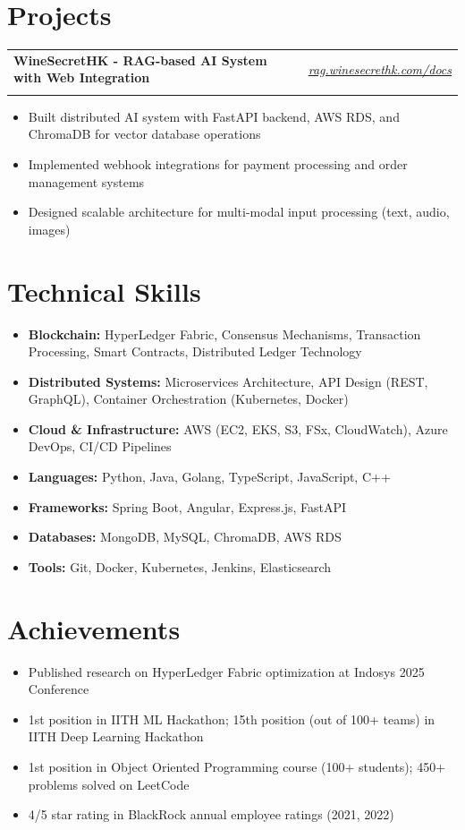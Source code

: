 \documentclass[11pt,a4paper]{article}
\makeatletter
\newcommand{\resumeItem}[1]{\item\small{#1}}
\newlength{\resumeLeftCol}
\newlength{\resumeRightCol}
\newcommand{\resumeHeading}[4]{
  \begin{tabular*}{\textwidth}{@{}p{\resumeLeftCol}@{\extracolsep{\fill}}>{\raggedleft\arraybackslash}p{\resumeRightCol}@{}}
    \textbf{#1} & \textit{#2} \\
    & \textit{\ifstrempty{#4}{#3}{#3 \ #4}}
  \end{tabular*}
  \vspace{-4pt}
}
\makeatother
\begin{document}
\section{Projects}
\resumeHeading{WineSecretHK - RAG-based AI System with Web Integration}{\href{https://rag.winesecrethk.com/docs}{rag.winesecrethk.com/docs}}{}{}
\begin{itemize}[leftmargin=*,noitemsep,topsep=0pt]
    \resumeItem{Built distributed AI system with FastAPI backend, AWS RDS, and ChromaDB for vector database operations}
    \resumeItem{Implemented webhook integrations for payment processing and order management systems}
    \resumeItem{Designed scalable architecture for multi-modal input processing (text, audio, images)}
\end{itemize}

\section{Technical Skills}
\begin{itemize}[leftmargin=*,noitemsep,topsep=0pt]
    \resumeItem{\textbf{Blockchain:} HyperLedger Fabric, Consensus Mechanisms, Transaction Processing, Smart Contracts, Distributed Ledger Technology}
    \resumeItem{\textbf{Distributed Systems:} Microservices Architecture, API Design (REST, GraphQL), Container Orchestration (Kubernetes, Docker)}
    \resumeItem{\textbf{Cloud \& Infrastructure:} AWS (EC2, EKS, S3, FSx, CloudWatch), Azure DevOps, CI/CD Pipelines}
    \resumeItem{\textbf{Languages:} Python, Java, Golang, TypeScript, JavaScript, C++}
    \resumeItem{\textbf{Frameworks:} Spring Boot, Angular, Express.js, FastAPI}
    \resumeItem{\textbf{Databases:} MongoDB, MySQL, ChromaDB, AWS RDS}
    \resumeItem{\textbf{Tools:} Git, Docker, Kubernetes, Jenkins, Elasticsearch}
\end{itemize}

\section{Achievements}
\begin{itemize}[leftmargin=*,noitemsep,topsep=0pt]
    \resumeItem{Published research on HyperLedger Fabric optimization at Indosys 2025 Conference}
    \resumeItem{1st position in IITH ML Hackathon; 15th position (out of 100+ teams) in IITH Deep Learning Hackathon}
    \resumeItem{1st position in Object Oriented Programming course (100+ students); 450+ problems solved on LeetCode}
    \resumeItem{4/5 star rating in BlackRock annual employee ratings (2021, 2022)}
\end{itemize}
\end{document}
